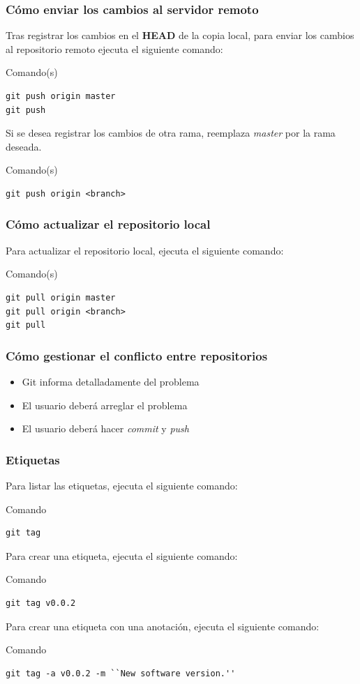 \documentclass{beamer}
\begin{document}
\begin{frame}[fragile]
\frametitle{Cómo enviar los cambios al servidor remoto}
Tras registrar los cambios en el \textbf{HEAD} de la copia local, para enviar los cambios al repositorio remoto ejecuta el siguiente comando:
\begin{block}{Comando(s)}
\begin{verbatim}
git push origin master
git push
\end{verbatim}
\end{block}
\vskip 1.00cm
Si se desea registrar los cambios de otra rama, reemplaza \textit{master} por la rama deseada.
\begin{block}{Comando(s)}
\begin{verbatim}
git push origin <branch>
\end{verbatim}
\end{block}
\end{frame}

\begin{frame}[fragile]
\frametitle{Cómo actualizar el repositorio local}
Para actualizar el repositorio local, ejecuta el siguiente comando:
\begin{block}{Comando(s)}
\begin{verbatim}
git pull origin master
git pull origin <branch>
git pull
\end{verbatim}
\end{block}
\end{frame}

\begin{frame}[fragile]
\frametitle{Cómo gestionar el conflicto entre repositorios}
\begin{itemize}
\item Git informa detalladamente del problema
\item El usuario deberá arreglar el problema
\item El usuario deberá hacer \textit{commit} y \textit{push}
\end{itemize}
\end{frame}

\begin{frame}[fragile]
\frametitle{Etiquetas}
Para listar las etiquetas, ejecuta el siguiente comando:
\begin{block}{Comando}
\begin{verbatim}
git tag
\end{verbatim}
\end{block}
\vskip 0.20cm
Para crear una etiqueta, ejecuta el siguiente comando:
\begin{block}{Comando}
\begin{verbatim}
git tag v0.0.2
\end{verbatim}
\end{block}
\vskip 0.20cm
Para crear una etiqueta con una anotación, ejecuta el siguiente comando:
\begin{block}{Comando}
\begin{verbatim}
git tag -a v0.0.2 -m ``New software version.''
\end{verbatim}
\end{block}
\end{frame}
\end{document}
